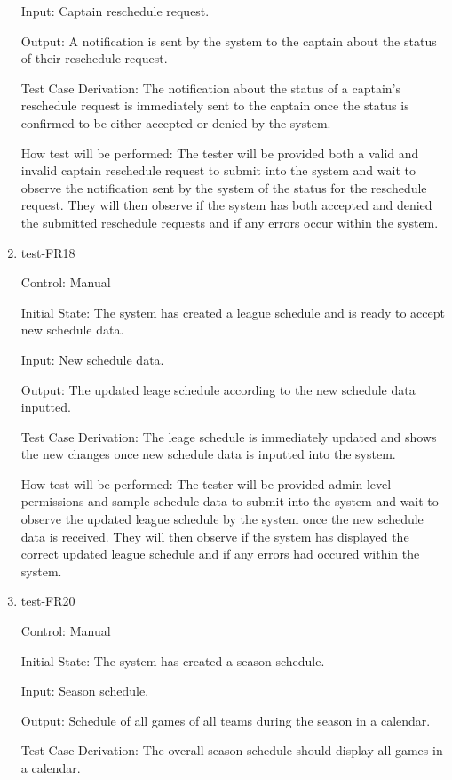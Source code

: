 \documentclass[12pt, titlepage]{article}
\begin{document}
\begin{enumerate}
  Input: Captain reschedule request.

  Output: A notification is sent by the system to the captain about the status of their
  reschedule request.

  Test Case Derivation: The notification about the status of a captain's reschedule
  request is immediately sent to the captain once the status is confirmed to be either
  accepted or denied by the system.

  How test will be performed: The tester will be provided both a valid and invalid captain
  reschedule request to submit into the system and wait to observe the notification sent
  by the system of the status for the reschedule request. They will then observe if the
  system has both accepted and denied the submitted reschedule requests and if any errors
  occur within the system. 

  \item{test-FR18\\}

  Control: Manual

  Initial State: The system has created a league schedule and is ready to
  accept new schedule data.

  Input: New schedule data.

  Output: The updated leage schedule according to the new schedule data inputted.

  Test Case Derivation: The leage schedule is immediately updated and shows the new changes
  once new schedule data is inputted into the system.

  How test will be performed: The tester will be provided admin level permissions and sample
  schedule data to submit into the system and wait to observe the updated league schedule
  by the system once the new schedule data is received. They will then observe if the
  system has displayed the correct updated league schedule and if any errors had
  occured within the system.

  \item{test-FR20\\}

  Control: Manual

  Initial State: The system has created a season schedule.

  Input: Season schedule.

  Output: Schedule of all games of all teams during the season in a calendar. 

  Test Case Derivation: The overall season schedule should display all games in a calendar.


\end{enumerate}
\end{document}
